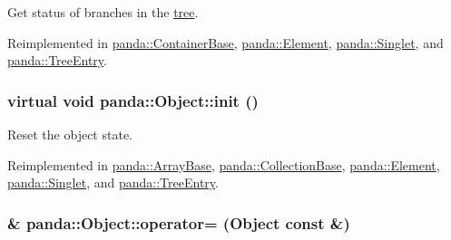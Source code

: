 Get status of branches in the \hyperlink{namespacepanda_1_1tree}{tree}. 

Reimplemented in \hyperlink{classpanda_1_1ContainerBase_a0fc7be3775bfe31f3819356d1cacda11}{panda::ContainerBase}, \hyperlink{classpanda_1_1Element_acab0938ba6e630b042052a960b58546e}{panda::Element}, \hyperlink{classpanda_1_1Singlet_a0d574c73f45883793b4ba0a84a14e2bd}{panda::Singlet}, and \hyperlink{classpanda_1_1TreeEntry_a3be7000fca4d0dd356488643aaa752dd}{panda::TreeEntry}.\hypertarget{classpanda_1_1Object_a204960e5f165a28176f9b4a42b9ea90c}{
\subsubsection[{init}]{\setlength{\rightskip}{0pt plus 5cm}virtual void panda::Object::init ()}}
\label{classpanda_1_1Object_a204960e5f165a28176f9b4a42b9ea90c}


Reset the object state. 

Reimplemented in \hyperlink{classpanda_1_1ArrayBase_a4df67e49765f19d5cd8596108eca11ed}{panda::ArrayBase}, \hyperlink{classpanda_1_1CollectionBase_acf4c92c41e6efccc8833981c8e8725c1}{panda::CollectionBase}, \hyperlink{classpanda_1_1Element_a5f48aa34efdae52533235d9703814de1}{panda::Element}, \hyperlink{classpanda_1_1Singlet_aef09da29df235d3cdbb2e870d1ca76cb}{panda::Singlet}, and \hyperlink{classpanda_1_1TreeEntry_a734130107a3568d87eb6570ab9b9ee60}{panda::TreeEntry}.\hypertarget{classpanda_1_1Object_a083629646c455db50ea99b994aac3b7b}{
\subsubsection[{operator=}]{\& panda::Object::operator= ({\bf Object} const \&)}}
\label{classpanda_1_1Object_a083629646c455db50ea99b994aac3b7b}


